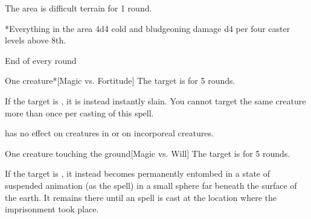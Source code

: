 \begin{comment}
\subsubsection{I}
\end{comment}

\spellrng{\rngmed}
\spellline
\spelleffect The area is difficult terrain for 1 round.
\begin{spelltargets}*{Everything in the area}
    \spellsuccess 4d4 cold and bludgeoning damage \add d4 per four caster levels above 8th.
\end{spelltargets}
\spellnotes \destructivespellnotes

\spellrng{\rngclose}
\spellline
\begin{spelltrigger}{End of every round}
    \begin{spelltarget}{One creature}*[Magic vs. Fortitude]
        \spellsuccess The target is \staggered for 5 rounds.

        If the target is \bloodied, it is instead instantly slain.
        \spellspecial You cannot target the same creature more than once per casting of this spell.
    \end{spelltarget}
\end{spelltrigger}
\spellnotes {} has no effect on creatures in  or on incorporeal creatures.

\spellrng{\rngclose}
\begin{spelltarget}{One creature touching the ground}[Magic vs. Will]
    \spellsuccess The target is \slowed for 5 rounds.

    \spellsuccess If the target is \bloodied, it instead becomes permanently entombed in a state of suspended animation (as the  spell) in a small sphere far beneath the surface of the earth. It remains there until an  spell is cast at the location where the imprisonment took place.
\end{spelltarget}

